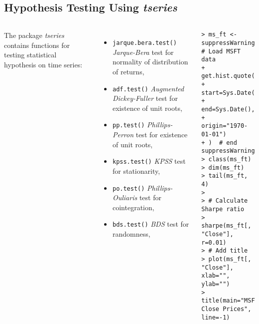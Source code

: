 \documentclass[10pt]{beamer}\usepackage[]{graphicx}\usepackage[]{color}
\makeatletter
\newenvironment{kframe}{%
 \def\at@end@of@kframe{}%
 \ifinner\ifhmode%
  \def\at@end@of@kframe{\end{minipage}}%
  \begin{minipage}{\columnwidth}%
 \fi\fi%
 \def\FrameCommand##1{\hskip\@totalleftmargin \hskip-\fboxsep
 \colorbox{shadecolor}{##1}\hskip-\fboxsep
     \hskip-\linewidth \hskip-\@totalleftmargin \hskip\columnwidth}%
 \MakeFramed {\advance\hsize-\width
   \@totalleftmargin\z@ \linewidth\hsize
   \@setminipage}}%
 {\par\unskip\endMakeFramed%
 \at@end@of@kframe}
\newenvironment{knitrout}{}{} %
\makeatother
\begin{document}
\subsection{Hypothesis Testing Using \protect\emph{tseries}}
\begin{frame}[fragile,t]{\subsecname}
\vspace{-1em}
\begin{block}{}
  \begin{columns}[T]
      The package \emph{tseries} contains functions for testing statistical hypothesis on time series:
      \begin{itemize}
        \item \texttt{jarque.bera.test()} \emph{Jarque-Bera} test for normality of distribution of returns,
        \item \texttt{adf.test()} \emph{Augmented Dickey-Fuller} test for existence of unit roots,
        \item \texttt{pp.test()} \emph{Phillips-Perron} test for existence of unit roots,
        \item \texttt{kpss.test()} \emph{KPSS} test for stationarity,
        \item \texttt{po.test()} \emph{Phillips-Ouliaris} test for cointegration,
        \item \texttt{bds.test()} \emph{BDS} test for randomness,
      \end{itemize}
      \vspace{-1em}
\begin{knitrout}\tiny
{}\color{fgcolor}\begin{kframe}
\begin{verbatim}
> ms_ft <- suppressWarnings(  # Load MSFT data
+   get.hist.quote(instrument="MSFT",
+            start=Sys.Date()-365,
+            end=Sys.Date(),
+            origin="1970-01-01")
+ )  # end suppressWarnings
> class(ms_ft)
> dim(ms_ft)
> tail(ms_ft, 4)
> 
> # Calculate Sharpe ratio
> sharpe(ms_ft[, "Close"], r=0.01)
> # Add title
> plot(ms_ft[, "Close"], xlab="", ylab="")
> title(main="MSFT Close Prices", line=-1)
\end{verbatim}
\end{kframe}
\end{knitrout}
  \end{columns}
\end{block}

\end{frame}
\end{document}
